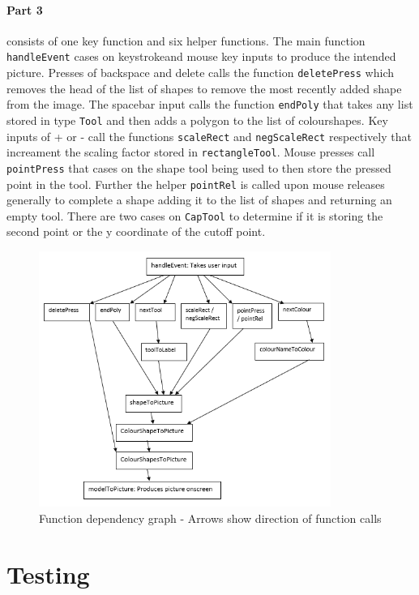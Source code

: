\documentclass[11pt]{article}
\begin{document}
\paragraph{Part 3} consists of one key function and six helper functions. The main function \verb|handleEvent| cases on keystrokeand mouse key inputs to produce the intended picture. Presses of backspace and delete calls the function \verb|deletePress| which removes the head of the list of shapes to remove the most recently added shape from the image. The spacebar input calls the function \verb|endPoly| that takes any list stored in type \verb|Tool| and then adds a polygon to the list of colourshapes. Key inputs of + or - call the functions \verb|scaleRect| and \verb|negScaleRect| respectively that increament the scaling factor stored in \verb|rectangleTool|. Mouse presses call \verb|pointPress| that cases on the shape tool being used to then store the pressed point in the tool. Further the helper \verb|pointRel| is called upon mouse releases generally to complete a shape adding it to the list of shapes and returning an empty tool. There are two cases on \verb|CapTool| to determine if it is storing the second point or the y coordinate of the cutoff point.
\begin{figure}[H]
\centering
\includegraphics[width=0.85\textwidth]{program.png}
\caption{Function dependency graph - Arrows show direction of function calls}
\end{figure}


\section{Testing}%
\end{document}
